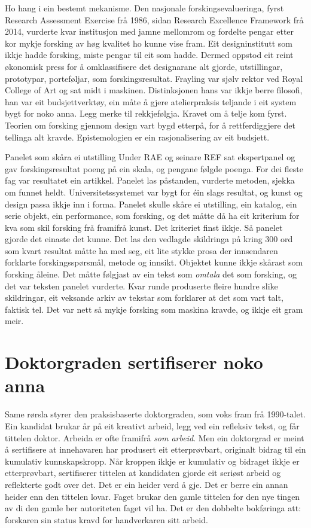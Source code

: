 Ho hang i ein bestemt mekanisme. Den nasjonale forskingsevalueringa, fyrst Research Assessment Exercise frå 1986, sidan Research Excellence Framework frå 2014, vurderte kvar institusjon med jamne mellomrom og fordelte pengar etter kor mykje forsking av høg kvalitet ho kunne vise fram. Eit designinstitutt som ikkje hadde forsking, miste pengar til eit som hadde. Dermed oppstod eit reint økonomisk press for å omklassifisere det designarane alt gjorde, utstillingar, prototypar, porteføljar, som forskingsresultat. Frayling var sjølv rektor ved Royal College of Art og sat midt i maskinen. Distinksjonen hans var ikkje berre filosofi, han var eit budsjettverktøy, ein måte å gjere atelierpraksis teljande i eit system bygt for noko anna. Legg merke til rekkjefølgja. Kravet om å telje kom fyrst. Teorien om forsking gjennom design vart bygd etterpå, for å rettferdiggjere det tellinga alt kravde. Epistemologien er ein rasjonalisering av eit budsjett.

\begin{kasus}{Panelet som skåra ei utstilling}
Under RAE og seinare REF sat ekspertpanel og gav forskingsresultat poeng på ein skala, og pengane følgde poenga. For dei fleste fag var resultatet ein artikkel. Panelet las påstanden, vurderte metoden, sjekka om funnet heldt. Universitetssystemet var bygt for éin slags resultat, og kunst og design passa ikkje inn i forma. Panelet skulle skåre ei utstilling, ein katalog, ein serie objekt, ein performance, som forsking, og det måtte då ha eit kriterium for kva som skil forsking frå framifrå kunst. Det kriteriet finst ikkje. Så panelet gjorde det einaste det kunne. Det las den vedlagde skildringa på kring 300 ord som kvart resultat måtte ha med seg, eit lite stykke prosa der innsendaren forklarte forskingsspørsmål, metode og innsikt. Objektet kunne ikkje skårast som forsking åleine. Det måtte følgjast av ein tekst som \emph{omtala} det som forsking, og det var teksten panelet vurderte. Kvar runde produserte fleire hundre slike skildringar, eit veksande arkiv av tekstar som forklarer at det som vart talt, faktisk tel. Det var nett så mykje forsking som maskina kravde, og ikkje eit gram meir.
\end{kasus}

\section{Doktorgraden sertifiserer noko anna}

Same rørsla styrer den praksisbaserte doktorgraden, som voks fram frå 1990-talet. Ein kandidat brukar år på eit kreativt arbeid, legg ved ein refleksiv tekst, og får tittelen doktor. Arbeida er ofte framifrå \emph{som arbeid}. Men ein doktorgrad er meint å sertifisere at innehavaren har produsert eit etterprøvbart, originalt bidrag til ein kumulativ kunnskapskropp. Når kroppen ikkje er kumulativ og bidraget ikkje er etterprøvbart, sertifiserer tittelen at kandidaten gjorde eit seriøst arbeid og reflekterte godt over det. Det er ein heider verd å gje. Det er berre ein annan heider enn den tittelen lovar. Faget brukar den gamle tittelen for den nye tingen av di den gamle ber autoriteten faget vil ha. Det er den dobbelte bokføringa att: forskaren sin status kravd for handverkaren sitt arbeid.


